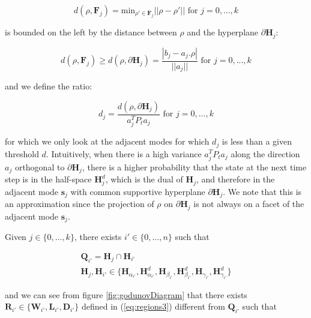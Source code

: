 \documentclass[11pt]{article}
\numberwithin{equation}{section}
\numberwithin{figure}{section}
\numberwithin{table}{section}
\begin{document}
\begin{equation}
d(\rho,\textbf{F}_{j}) = \text{min}_{\rho'\in \textbf{F}_{j}} ||\rho-\rho'|| \text{ for }j=0,...,k
\label{eq:distance}
\end{equation}

\noindent is bounded on the left by the distance between $\rho$ and the hyperplane $\partial\textbf{H}_{j}$:

\begin{equation}
d(\rho,\textbf{F}_{j})\geq d(\rho,\partial\textbf{H}_{j})=\frac{|b_{j}-a_{j}.\rho|}{||a_{j}||} \text{ for }j=0,...,k
\label{eq:lowerBound}
\end{equation}

\noindent and we define the ratio:

\begin{equation}
d_{j}=\frac{d(\rho,\partial\textbf{H}_{j})}{a^{T}_{j} P_{t} a_{j}}\text{ for }j=0,...,k
\label{eq:ratio}
\end{equation}

\noindent for which we only look at the adjacent modes for which $d_{j}$ is less than a given threshold $d$. Intuitively, when there is a high variance $a^{T}_{j} P_{t} a_{j}$ along the direction $a_{j}$ orthogonal to $\partial\textbf{H}_{j}$, there is a higher probability that the state at the next time step is in the half-space $\textbf{H}^{d}_{j}$, which is the dual of $\textbf{H}_{j}$, and therefore in the adjacent mode $\boldsymbol s_{j}$ with common supportive hyperplane $\partial\textbf{H}_{j}$. We note that this is an approximation since the projection of $\rho$ on $\partial\textbf{H}_{j}$ is not always on a facet of the adjacent mode $\boldsymbol s_{j}$.

Given $j\in\{0,...,k\}$, there exists $i'\in\{0,...,n\}$ such that

\begin{equation}
\begin{array}{l}
\textbf{Q}_{i'}=\textbf{H}_{j}\cap \textbf{H}_{i'}\\
\textbf{H}_{j}, \textbf{H}_{i'}\in \{\textbf{H}_{\alpha_{i'}}, \textbf{H}^{d}_{\alpha_{i'}}, \textbf{H}_{\beta_{i'}}, \textbf{H}^{d}_{\beta_{i'}}, \textbf{H}_{\gamma_{i'}}, \textbf{H}^{d}_{\gamma_{i'}}\}
\end{array}
\label{eq:modeSearch1}
\end{equation}

\noindent and we can see from figure \ref{fig:godunovDiagram} that there exists $\textbf{R}_{i'} \in \{\textbf{W}_{i'}, \textbf{L}_{i'}, \textbf{D}_{i'}\}$ defined in (\ref{eq:regions3}) different from $\textbf{Q}_{i'}$ such that
\end{document}
